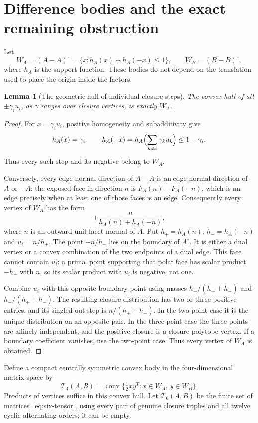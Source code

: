 \documentclass[11pt,a4paper]{article}
\newtheorem{lemma}[theorem]{Lemma}
\theoremstyle{definition}\newtheorem{definition}[theorem]{Definition}
\theoremstyle{remark}\newtheorem{remark}[theorem]{Remark}
\newcommand{\conv}{\operatorname{conv}}
\newcommand{\Tfour}{\mathcal T_4}
\newcommand{\Tsix}{\mathcal T_6}
\begin{document}
\section{Difference bodies and the exact remaining obstruction}\label{sec:width}
Let
\[
 W_A=(A-A)^\circ=\{x:h_A(x)+h_A(-x)\le1\},
 \qquad W_B=(B-B)^\circ,
\]
where $h_A$ is the support function. These bodies do not depend on the translation used to place the origin inside the factors.

\begin{lemma}[The geometric hull of individual closure steps]\label{lem:width}
The convex hull of all $\pm\gamma_i u_i$, as $\gamma$ ranges over closure vertices, is exactly $W_A$.
\end{lemma}
\begin{proof}
For $x=\gamma_i u_i$, positive homogeneity and subadditivity give
\[
 h_A(x)=\gamma_i,\qquad
 h_A(-x)=h_A\Bigl(\sum_{k\ne i}\gamma_k u_k\Bigr)\le1-\gamma_i.
\]
Thus every such step and its negative belong to $W_A$.

Conversely, every edge-normal direction of $A-A$ is an edge-normal direction of $A$ or $-A$: the exposed face in direction $n$ is $F_A(n)-F_A(-n)$, which is an edge precisely when at least one of those faces is an edge. Consequently every vertex of $W_A$ has the form
\[
 \pm\frac{n}{h_A(n)+h_A(-n)},
\]
where $n$ is an outward unit facet normal of $A$. Put $h_+=h_A(n)$, $h_-=h_A(-n)$ and $u_i=n/h_+$. The point $-n/h_-$ lies on the boundary of $A^\circ$. It is either a dual vertex or a convex combination of the two endpoints of a dual edge. This face cannot contain $u_i$: a primal point supporting that polar face has scalar product $-h_-$ with $n$, so its scalar product with $u_i$ is negative, not one.

Combine $u_i$ with this opposite boundary point using masses $h_+/(h_++h_-)$ and $h_-/(h_++h_-)$. The resulting closure distribution has two or three positive entries, and its singled-out step is $n/(h_++h_-)$. In the two-point case it is the unique distribution on an opposite pair. In the three-point case the three points are affinely independent, and the positive closure is a closure-polytope vertex. If a boundary coefficient vanishes, use the two-point case. Thus every vertex of $W_A$ is obtained.
\end{proof}

Define a compact centrally symmetric convex body in the four-dimensional matrix space by
\begin{equation}\label{eq:Tfour}
 \Tfour(A,B)=\conv\{\tfrac12xy^T:x\in W_A,\ y\in W_B\}.
\end{equation}
Products of vertices suffice in this convex hull. Let $\Tsix(A,B)$ be the finite set of matrices~\eqref{eq:six-tensor}, using every pair of genuine closure triples and all twelve cyclic alternating orders; it can be empty.
\end{document}
